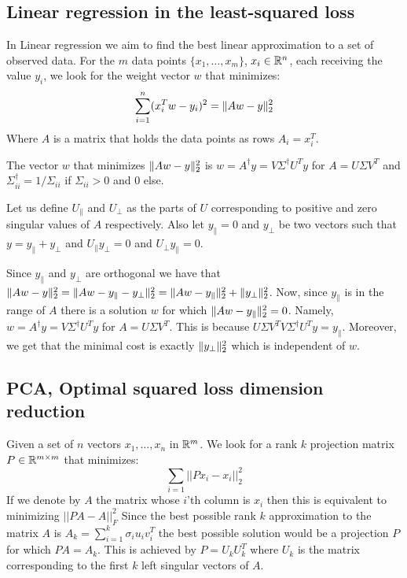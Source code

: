 \documentclass{article}
\begin{document}
\subsection*{Linear regression in the least-squared loss}
In Linear regression we aim to find the best linear approximation 
to a set of observed data. For the $m$ data  points $\{x_1,\ldots,x_m\}$,  $x_i \in {\mathbb{R}}^n$,
each receiving the value $y_i$, we look for the weight vector $w$ that minimizes:
\[
\sum_{i=1}^{n} (x_{i}^{T}w - y_i)^2 = \| Aw - y \|_{2}^{2}
\]
Where $A$ is a matrix that holds the data points as rows $A_i = x^{T}_{i}$.

\begin{proposition}
The vector $w$ that minimizes $\| Aw - y \|_{2}^{2}$ is $w = A^{\dagger}y = V\Sigma^{\dagger}U^{T}y$
for $A = U\Sigma V^T$ and $\Sigma^{\dagger}_{ii} = 1/\Sigma_{ii}$ if $\Sigma_{ii} > 0$ and $0$ else. 
\end{proposition}

Let us define $U_{\parallel}$ and $U_{\perp}$ as the parts of $U$ corresponding to positive and zero singular values of $A$ respectively. 
Also let $y_{\parallel} = 0$ and $y_{\perp}$ be two vectors such that $y = y_{\parallel}+y_{\perp}$ and 
$U_{\parallel}y_{\perp} = 0$ and $U_{\perp}y_{\parallel}=0$.

Since $y_{\parallel}$ and $y_{\perp}$ are orthogonal we have that  $\| Aw - y \|_{2}^{2}
= \| Aw - y_{\parallel}-y_{\perp} \|_{2}^{2} = \| Aw - y_{\parallel} \|_{2}^{2} + \| y_{\perp} \|_{2}^{2}$.
Now, since $y_{\parallel}$ is in the range of $A$ there is a solution $w$ for which $\| Aw - y_{\parallel} \|_{2}^{2} = 0$.
Namely, $w = A^{\dagger}y = V\Sigma^{\dagger}U^{T}y$ for $A = U\Sigma V^{T}$. This is because $U\Sigma V^{T}V\Sigma^{\dagger}U^{T}y = y_{\parallel}$.
Moreover, we get that the minimal cost is exactly $ \| y_{\perp} \|_{2}^{2}$ which is independent of $w$.


\subsection*{PCA, Optimal squared loss dimension reduction}

Given a set of $n$ vectors $x_1,\ldots,x_n$ in ${\mathbb{R}}^{m}$. We look for a rank $k$ 
projection matrix $P \in {\mathbb{R}}^{m \times m}$ that minimizes:
\[
\sum_{i=1} ||Px_{i} - x_{i}||_{2}^{2}
\]
If we denote by $A$ the matrix whose $i$'th column is $x_i$ then this is equivalent to minimizing $||PA - A||_{F}^{2}$
Since the best possible rank $k$ approximation to the matrix $A$ is $A_{k} = \sum_{i=1}^{k}\sigma_{i}u_{i}v_{i}^{T}$ the best
possible solution would be a projection $P$ for which $PA = A_{k}$. This is achieved by $P = U_{k}U_{k}^{T}$ where $U_{k}$
is the matrix corresponding to the first $k$ left singular vectors of $A$. 
\end{document}

